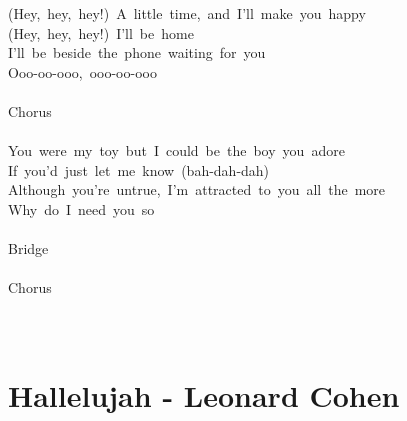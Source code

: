 \documentclass[]{book}
\let\stdsection\section
\renewcommand\section{\clearpage\stdsection}
\begin{document}
(Hey,~hey,~hey!)~A~little~time,~and~I'll~make~you~happy\\
(Hey,~hey,~hey!)~I'll~be~home\\
I'll~be~beside~the~phone~waiting~for~you\\
Ooo-oo-ooo,~ooo-oo-ooo\\
~\\
Chorus\\
~\\
You~were~my~toy~but~I~could~be~the~boy~you~adore\\
If~you'd~just~let~me~know~(bah-dah-dah)\\
Although~you're~untrue,~I'm~attracted~to~you~all~the~more\\
Why~do~I~need~you~so\\
~\\
Bridge\\
~\\
Chorus\\
~\\
~\\

\hypertarget{hallelujah---leonard-cohen}{%
\section{Hallelujah - Leonard Cohen}\label{hallelujah---leonard-cohen}}
\end{document}

